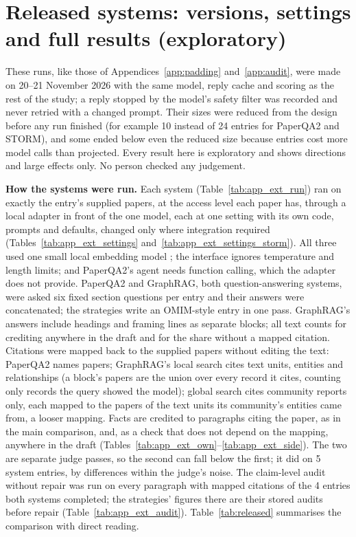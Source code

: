 \documentclass{article} %
\begin{document}
\section{Released systems: versions, settings and full results (exploratory)}
\label{app:released}
These runs, like those of Appendices~\ref{app:padding} and~\ref{app:audit}, were made on 20--21 November 2026 with the same model, reply cache and scoring as the rest of the study; a reply stopped by the model's safety filter was recorded and never retried with a changed prompt. Their sizes were reduced from the design before any run finished (for example 10 instead of 24 entries for PaperQA2 and STORM), and some ended below even the reduced size because entries cost more model calls than projected. Every result here is exploratory and shows directions and large effects only. No person checked any judgement.

\textbf{How the systems were run.} Each system (Table~\ref{tab:app_ext_run}) ran on exactly the entry's supplied papers, at the access level each paper has, through a local adapter in front of the one model, each at one setting with its own code, prompts and defaults, changed only where integration required (Tables~\ref{tab:app_ext_settings} and~\ref{tab:app_ext_settings_storm}). All three used one small local embedding model \citep{Xiao2023CpackPacked}; the interface ignores temperature and length limits; and PaperQA2's agent needs function calling, which the adapter does not provide. PaperQA2 and GraphRAG, both question-answering systems, were asked six fixed section questions per entry and their answers were concatenated; the strategies write an OMIM-style entry in one pass. GraphRAG's answers include headings and framing lines as separate blocks; all text counts for crediting anywhere in the draft and for the share without a mapped citation. Citations were mapped back to the supplied papers without editing the text: PaperQA2 names papers; GraphRAG's local search cites text units, entities and relationships (a block's papers are the union over every record it cites, counting only records the query showed the model); global search cites community reports only, each mapped to the papers of the text units its community's entities came from, a looser mapping. Facts are credited to paragraphs citing the paper, as in the main comparison, and, as a check that does not depend on the mapping, anywhere in the draft (Tables~\ref{tab:app_ext_own}--\ref{tab:app_ext_side}). The two are separate judge passes, so the second can fall below the first; it did on 5 system entries, by differences within the judge's noise. The claim-level audit without repair was run on every paragraph with mapped citations of the 4 entries both systems completed; the strategies' figures there are their stored audits before repair (Table~\ref{tab:app_ext_audit}). Table~\ref{tab:released} summarises the comparison with direct reading.
\end{document}
